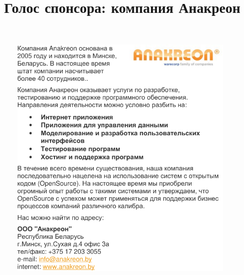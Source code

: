 \documentclass[10pt, a5paper]{article}
\begin{document}
\title{Голос спонсора: компания Анакреон}
\date{}
\maketitle
\begin{figure}[h!]
\includegraphics[width=11cm]{54_spons_anakreon.pdf}
\end{figure}
\end{document}
